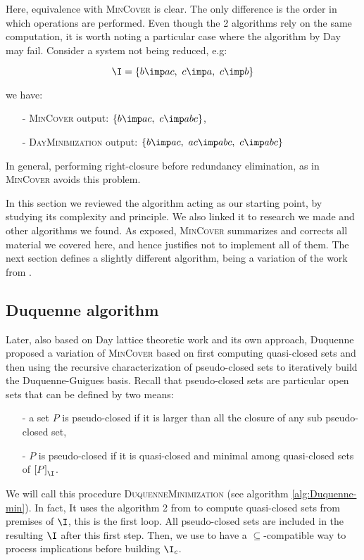 \noindent Here, equivalence with \textsc{MinCover} is clear. The only difference
is the order in which operations are performed. Even though the 2 algorithms 
rely on the same computation, it is worth noting a particular case where the
algorithm by Day may fail. Consider a system not being reduced, e.g:

\[ \I =  \{ b \imp ac, \ c \imp a, \  c \imp b \} \]

\noindent we have:
\begin{itemize}
	\item[-] \textsc{MinCover} output: $\{ b \imp ac, \ c \imp abc \}$,
	\item[-] \textsc{DayMinimization} output: $ \{ b \imp ac, \ ac \imp abc, \  c \imp abc \}$
\end{itemize}
In general, performing right-closure before redundancy elimination, as in 
\textsc{MinCover} avoids this problem. 

\vspace{1.2em}

In this section we reviewed the algorithm acting as our starting point, by 
studying its complexity and principle. We also linked it to research we made
and other algorithms we found. As exposed, \textsc{MinCover} summarizes and 
corrects all material we covered here, and hence justifies not to implement
all of them. The next section defines a slightly different algorithm, being a
variation of the work from \cite{day_lattice_1992}.

\subsection{Duquenne algorithm}

Later, also based on Day lattice theoretic work and its own approach, Duquenne
proposed a variation of \textsc{MinCover} based on first computing quasi-closed
sets and then using the recursive characterization of pseudo-closed sets to iteratively build the Duquenne-Guigues basis. Recall that pseudo-closed sets
are particular open sets that can be defined by two means:
\begin{itemize}
	\item[-] a set $P$ is pseudo-closed if it is larger than all the closure of any	sub pseudo-closed set,
	\item[-] $P$ is pseudo-closed if it is quasi-closed and minimal among quasi-closed sets of $\left[ P \right]_{\I}$.
\end{itemize}
We will call this procedure \textsc{DuquenneMinimization} (see algorithm \ref{alg:Duquenne-min}). In fact, It uses the algorithm 2 from \cite{day_lattice_1992} to compute quasi-closed sets from premises of $\I$,
this is the first loop. All pseudo-closed sets are included in the resulting $\I$ after this first step. Then, we use  to have a $\subseteq$-compatible way to process implications before building $\I_c$.


